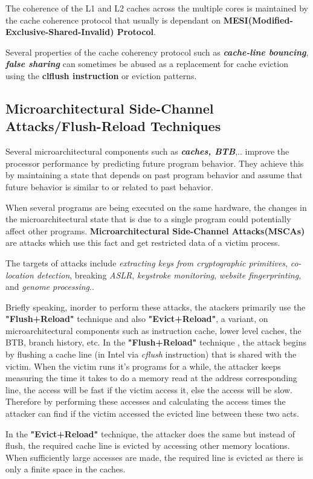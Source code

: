 \documentclass[12pt]{article}
\begin{document}
The coherence of the L1 and L2 caches across the multiple cores is maintained by the cache coherence protocol that usually is dependant on \textbf{MESI(Modified-Exclusive-Shared-Invalid) Protocol}.

Several properties of the cache coherency protocol such as \textbf{\textit{cache-line bouncing}}, \textbf{\textit{false sharing}} can sometimes be abused as a replacement for cache eviction using the \textbf{clflush instruction} or eviction patterns.
\subsection{Microarchitectural Side-Channel Attacks/Flush-Reload Techniques}
Several microarchitectural components such as \textbf{\textit{caches, BTB}},.. improve the processor performance by predicting future program behavior. They achieve this by maintaining a state that depends on past program behavior and assume that future behavior is similar to or related to past behavior. 

When several programs are being executed on the same hardware, the changes in the microarchitectural state that is due to a single program could potentially affect other programs. \textbf{Microarchitectural Side-Channel Attacks(MSCAs)} are attacks which use this fact and get restricted data of a victim process.

The targets of attacks include \textit{extracting keys from cryptographic primitives}, \textit{co-location detection}, breaking \textit{ASLR}, \textit{keystroke monitoring}, \textit{website fingerprinting}, and \textit{genome processing}..

Briefly speaking, inorder to perform these attacks, the atackers primarily use the \textbf{"Flush+Reload"}
technique and also \textbf{"Evict+Reload"}, a variant, on microarchitectural components such as instruction cache, lower level caches, the BTB, branch history, etc. 
\newpage
In the \textbf{"Flush+Reload"} technique , the attack begins by flushing a cache line (in Intel via \textit{cflush} instruction) that is shared with the victim. When the victim runs it's programs for a while, the attacker keeps measuring the time it takes to do a memory read at the address corresponding line, the access will be fast if the victim access it, else the access will be slow. Therefore by performing these accesses and calculating the access times the attacker can find if the victim accessed the evicted line between these two acts.

In the \textbf{"Evict+Reload"} technique, the attacker does the same but instead of flush, the required cache line is evicted by accessing other memory locations. When sufficiently large accesses are made, the required line is evicted as there is only a finite space in the caches.
\end{document}
